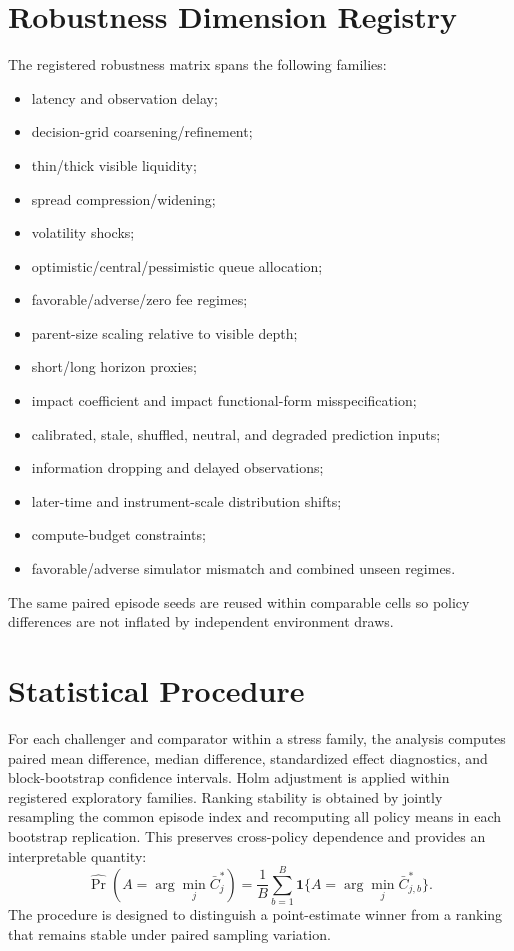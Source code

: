 \documentclass[journal,10pt]{IEEEtran}
\newcommand{\1}{\mathbf{1}}
\begin{document}
\section{Robustness Dimension Registry}
\label{app:robustness}
The registered robustness matrix spans the following families:
\begin{itemize}[leftmargin=*]
    \item latency and observation delay;
    \item decision-grid coarsening/refinement;
    \item thin/thick visible liquidity;
    \item spread compression/widening;
    \item volatility shocks;
    \item optimistic/central/pessimistic queue allocation;
    \item favorable/adverse/zero fee regimes;
    \item parent-size scaling relative to visible depth;
    \item short/long horizon proxies;
    \item impact coefficient and impact functional-form misspecification;
    \item calibrated, stale, shuffled, neutral, and degraded prediction inputs;
    \item information dropping and delayed observations;
    \item later-time and instrument-scale distribution shifts;
    \item compute-budget constraints;
    \item favorable/adverse simulator mismatch and combined unseen regimes.
\end{itemize}
The same paired episode seeds are reused within comparable cells so policy differences are not inflated by independent environment draws.

\section{Statistical Procedure}
For each challenger and comparator within a stress family, the analysis computes paired mean difference, median difference, standardized effect diagnostics, and block-bootstrap confidence intervals. Holm adjustment is applied within registered exploratory families. Ranking stability is obtained by jointly resampling the common episode index and recomputing all policy means in each bootstrap replication. This preserves cross-policy dependence and provides an interpretable quantity:
\begin{equation}
\widehat{\Pr}(A=\arg\min_j \bar C_j^*) = \frac{1}{B}\sum_{b=1}^{B}\1\{A=\arg\min_j \bar C_{j,b}^*\}.
\end{equation}
The procedure is designed to distinguish a point-estimate winner from a ranking that remains stable under paired sampling variation.
\end{document}
